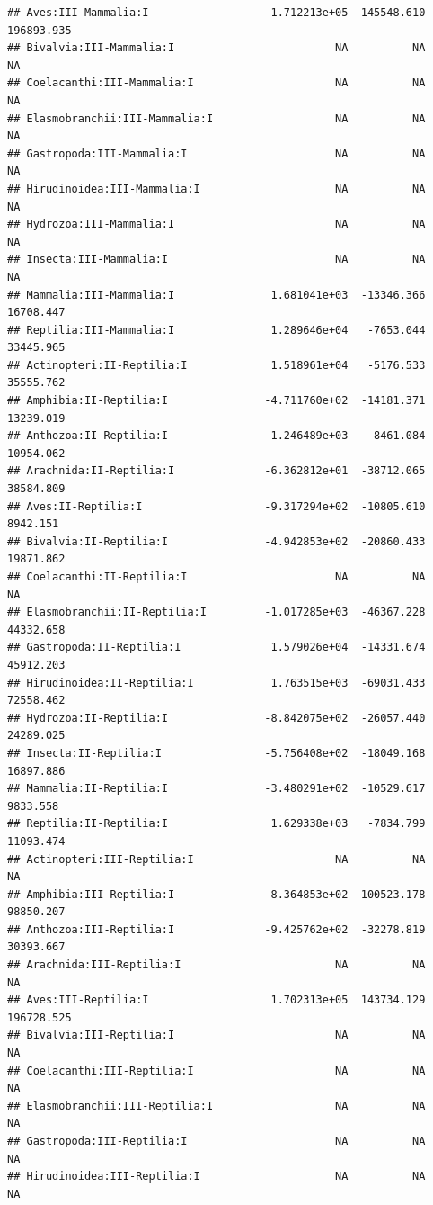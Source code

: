 \documentclass[
  12pt,
]{article}
\begin{document}
\begin{verbatim}
## Aves:III-Mammalia:I                   1.712213e+05  145548.610  196893.935
## Bivalvia:III-Mammalia:I                         NA          NA          NA
## Coelacanthi:III-Mammalia:I                      NA          NA          NA
## Elasmobranchii:III-Mammalia:I                   NA          NA          NA
## Gastropoda:III-Mammalia:I                       NA          NA          NA
## Hirudinoidea:III-Mammalia:I                     NA          NA          NA
## Hydrozoa:III-Mammalia:I                         NA          NA          NA
## Insecta:III-Mammalia:I                          NA          NA          NA
## Mammalia:III-Mammalia:I               1.681041e+03  -13346.366   16708.447
## Reptilia:III-Mammalia:I               1.289646e+04   -7653.044   33445.965
## Actinopteri:II-Reptilia:I             1.518961e+04   -5176.533   35555.762
## Amphibia:II-Reptilia:I               -4.711760e+02  -14181.371   13239.019
## Anthozoa:II-Reptilia:I                1.246489e+03   -8461.084   10954.062
## Arachnida:II-Reptilia:I              -6.362812e+01  -38712.065   38584.809
## Aves:II-Reptilia:I                   -9.317294e+02  -10805.610    8942.151
## Bivalvia:II-Reptilia:I               -4.942853e+02  -20860.433   19871.862
## Coelacanthi:II-Reptilia:I                       NA          NA          NA
## Elasmobranchii:II-Reptilia:I         -1.017285e+03  -46367.228   44332.658
## Gastropoda:II-Reptilia:I              1.579026e+04  -14331.674   45912.203
## Hirudinoidea:II-Reptilia:I            1.763515e+03  -69031.433   72558.462
## Hydrozoa:II-Reptilia:I               -8.842075e+02  -26057.440   24289.025
## Insecta:II-Reptilia:I                -5.756408e+02  -18049.168   16897.886
## Mammalia:II-Reptilia:I               -3.480291e+02  -10529.617    9833.558
## Reptilia:II-Reptilia:I                1.629338e+03   -7834.799   11093.474
## Actinopteri:III-Reptilia:I                      NA          NA          NA
## Amphibia:III-Reptilia:I              -8.364853e+02 -100523.178   98850.207
## Anthozoa:III-Reptilia:I              -9.425762e+02  -32278.819   30393.667
## Arachnida:III-Reptilia:I                        NA          NA          NA
## Aves:III-Reptilia:I                   1.702313e+05  143734.129  196728.525
## Bivalvia:III-Reptilia:I                         NA          NA          NA
## Coelacanthi:III-Reptilia:I                      NA          NA          NA
## Elasmobranchii:III-Reptilia:I                   NA          NA          NA
## Gastropoda:III-Reptilia:I                       NA          NA          NA
## Hirudinoidea:III-Reptilia:I                     NA          NA          NA

\end{verbatim}
\end{document}
